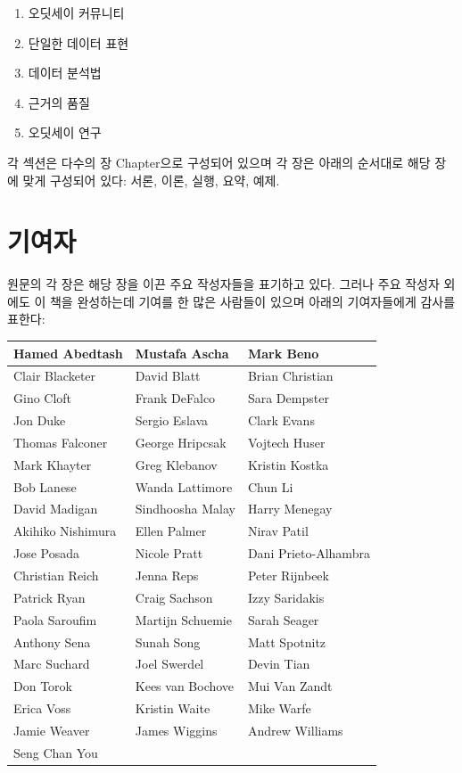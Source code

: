 \documentclass[10.5pt]{book}
\providecommand{\tightlist}{%
  \setlength{\itemsep}{0pt}\setlength{\parskip}{0pt}}
\theoremstyle{definition}
\theoremstyle{definition}
\theoremstyle{definition}
\theoremstyle{remark}
\begin{document}
\begin{enumerate}
\def\labelenumi{\Roman{enumi})}
\tightlist
\item
  오딧세이 커뮤니티
\item
  단일한 데이터 표현
\item
  데이터 분석법
\item
  근거의 품질
\item
  오딧세이 연구
\end{enumerate}

각 섹션은 다수의 장 Chapter으로 구성되어 있으며 각 장은 아래의 순서대로
해당 장에 맞게 구성되어 있다: 서론, 이론, 실행, 요약, 예제.

\section*{기여자}

원문의 각 장은 해당 장을 이끈 주요 작성자들을 표기하고 있다. 그러나 주요
작성자 외에도 이 책을 완성하는데 기여를 한 많은 사람들이 있으며 아래의
기여자들에게 감사를 표한다:

\begin{tabular}{l|l|l}
\hline
Hamed Abedtash & Mustafa Ascha & Mark Beno\\
\hline
Clair Blacketer & David Blatt & Brian Christian\\
\hline
Gino Cloft & Frank DeFalco & Sara Dempster\\
\hline
Jon Duke & Sergio Eslava & Clark Evans\\
\hline
Thomas Falconer & George Hripcsak & Vojtech Huser\\
\hline
Mark Khayter & Greg Klebanov & Kristin Kostka\\
\hline
Bob Lanese & Wanda Lattimore & Chun Li\\
\hline
David Madigan & Sindhoosha Malay & Harry Menegay\\
\hline
Akihiko Nishimura & Ellen Palmer & Nirav Patil\\
\hline
Jose Posada & Nicole Pratt & Dani Prieto-Alhambra\\
\hline
Christian Reich & Jenna Reps & Peter Rijnbeek\\
\hline
Patrick Ryan & Craig Sachson & Izzy Saridakis\\
\hline
Paola Saroufim & Martijn Schuemie & Sarah Seager\\
\hline
Anthony Sena & Sunah Song & Matt Spotnitz\\
\hline
Marc Suchard & Joel Swerdel & Devin Tian\\
\hline
Don Torok & Kees van Bochove & Mui Van Zandt\\
\hline
Erica Voss & Kristin Waite & Mike Warfe\\
\hline
Jamie Weaver & James Wiggins & Andrew Williams\\
\hline
Seng Chan You &  & \\
\hline
\end{tabular}
\end{document}
